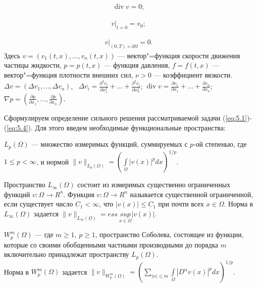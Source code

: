 \begin{equation}\label{eq:5.2}
    \begin{gathered}
        \operatorname{div} v=0;
    \end{gathered}
\end{equation}

\begin{equation}\label{eq:5.3}
    \begin{gathered}
        v|_{t=0}=v_0;
    \end{gathered}
\end{equation}

\begin{equation}\label{eq:5.4}
    \begin{gathered}
        v|_{(0, T)\times\partial\Omega}=0.
    \end{gathered}
\end{equation}
Здесь $v=(v_1(t, x),\ldots,v_n(t, x))$ --- вектор"=функция скорости движения частицы жидкости, $p=p(t, x)$ --- функция давления,
$f=f(t, x)$ --- вектор"=функция плотности внешних сил, $\nu>0$ --- коэффициент вязкости.
$\Delta v=(\Delta v_1,\ldots,\Delta v_n)$, \ $\Delta v_i= \frac{\partial^2 v_i}{\partial x_1^2}+\ldots+\frac{\partial^2 v_i}{\partial x_n^2}$;
$\operatorname{div} v= \frac{\partial v_1}{\partial x_1}+\ldots+\frac{\partial v_n}{\partial x_n}$;
$\nabla p=(\frac{\partial p}{\partial x_1},\ldots,\frac{\partial p}{\partial x_n})$.

Сформулируем определение сильного решения рассматриваемой задачи (\ref{eq:5.1})-(\ref{eq:5.4}).
Для этого введем необходимые функциональные пространства:

$L_p(\Omega)$ --- множество измеримых функций, суммируемых с $p$-ой степенью, где $1\le p< \infty$,
и нормой $\|v\|_{L_p(\Omega)}=(\int\limits_\Omega |v(x)|^pdx)^{1/p}$.

Пространство $L_{\infty}(\Omega)$ состоит из измеримых существенно ограниченных функций $v:\Omega\rightarrow R^n$. 
Функция $v:\Omega\rightarrow R^n$ называется существенной ограниченной, если существует число $C_1<\infty$, что $|v(x)|\le C_1$ при почти всех $x\in\Omega$.
Норма в $L_{\infty}(\Omega)$ задается
$\|v\|_{L_{\infty}(\Omega)}=ess \ \underset{x\in\Omega}{sup} |v(x)|$.

$W_p^m(\Omega)$ --- где $m\geqslant 1, \ p\geqslant 1$, пространство Соболева, состоящее из
функции, которые со своими обобщенными частными производными до порядка $m$ включительно принадлежат пространству $L_p(\Omega)$.\\
Норма в $W_p^m(\Omega)$ задается $\|v\|_{W_p^m(\Omega)}=\left(\sum\limits_{|\alpha|\leqslant m} \int\limits_\Omega |D^{\alpha}v(x)|^pdx\right)^{1/p}$.

